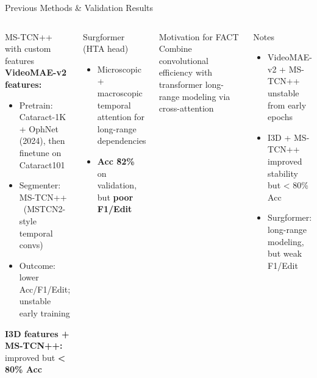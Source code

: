 \documentclass[9pt,aspectratio=169]{beamer}
\newcommand{\factmodel}{\textsc{FACT}\xspace}
\begin{document}
\begin{frame}[label=slide2]{Previous Methods \& Validation Results}
  \begin{columns}[T,onlytextwidth]
      \begin{block}{MS-TCN++ with custom features}
        \textbf{VideoMAE-v2 features:}
        \begin{itemize}
          \item Pretrain: Cataract-1K + OphNet (2024), then finetune on Cataract101
          \item Segmenter: MS-TCN++ \ (MSTCN2-style temporal convs)
          \item Outcome: lower Acc/F1/Edit; unstable early training
        \end{itemize}
        \textbf{I3D features + MS-TCN++:} improved but \textbf{< 80\% Acc}
      \end{block}

      \begin{block}{Surgformer (HTA head)}
        \begin{itemize}
          \item Microscopic + macroscopic temporal attention for long-range dependencies
          \item \textbf{Acc \~82\%} on validation, but \textbf{poor F1/Edit}
        \end{itemize}
      \end{block}

      \begin{block}{Motivation for \factmodel}
        Combine convolutional efficiency with transformer long-range modeling via cross-attention
      \end{block}

      \begin{block}{Notes}
        \scriptsize
        \vspace{-0.4em}
        \begin{itemize}
          \item VideoMAE-v2 + MS-TCN++ unstable from early epochs
          \item I3D + MS-TCN++ improved stability but < 80\% Acc
          \item Surgformer: long-range modeling, but weak F1/Edit
        \end{itemize}
        \vspace{-0.2em}
      \end{block}
  \end{columns}
\end{frame}
\end{document}
